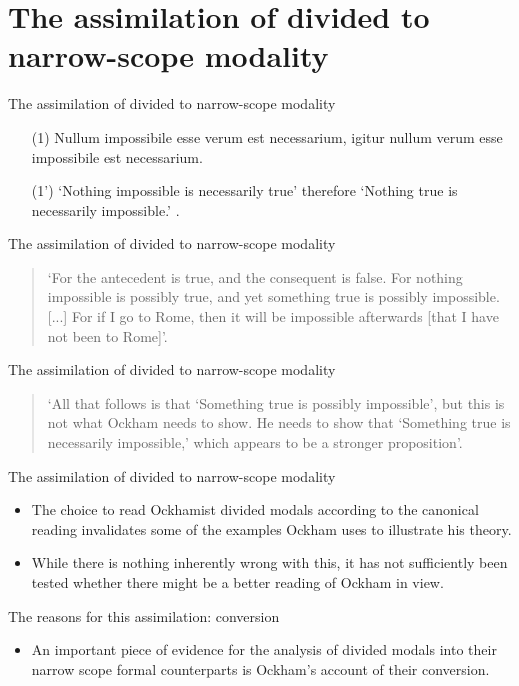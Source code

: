 \documentclass{beamer}
\begin{document}
\section{The assimilation of divided to narrow-scope modality}
\begin{frame}{The assimilation of divided to narrow-scope modality}
	\begin{enumerate}
		\item[(1)] Nullum impossibile esse verum est necessarium, igitur nullum verum esse impossibile est necessarium. \cite[p. 298]{OckhamSL2} \pause 
		\item[(1')]	`Nothing impossible is necessarily true' therefore `Nothing true is necessarily impossible.' \cite[p. 166]{OckhamSLEng}.
	\end{enumerate}
\end{frame}
\begin{frame}{The assimilation of divided to narrow-scope modality}
	\begin{quote}
		`For the antecedent is true, and the consequent is false. For nothing impossible is possibly true, and yet something true is possibly impossible. [...] For if I go to Rome, then it will be impossible afterwards [that I have not been to Rome]'. \cite[p. 166]{OckhamSLEng}
	\end{quote}
\end{frame}
\begin{frame}{The assimilation of divided to narrow-scope modality}
	\begin{quote}
		`All that follows is that `Something true is possibly impossible', but this is not what Ockham needs to show. He needs to show that `Something true is necessarily impossible,' which appears to be a stronger proposition'.  \cite[p. 243]{Johnston2015}
	\end{quote}
\end{frame}
\begin{frame}{The assimilation of divided to narrow-scope modality}
	\begin{itemize}
		\item The choice to read Ockhamist divided modals according to the canonical reading invalidates some of the examples Ockham uses to illustrate his theory. \pause
		\item While there is nothing inherently wrong with this, it has not sufficiently been tested whether there might be a better reading of Ockham in view.
	\end{itemize}
\end{frame}
\begin{frame}{The reasons for this assimilation: conversion}
	\begin{itemize}
		\item An important piece of evidence for the analysis of divided modals into their narrow scope formal counterparts is Ockham's account of their conversion.
	\end{itemize}
\end{frame}
\end{document}
